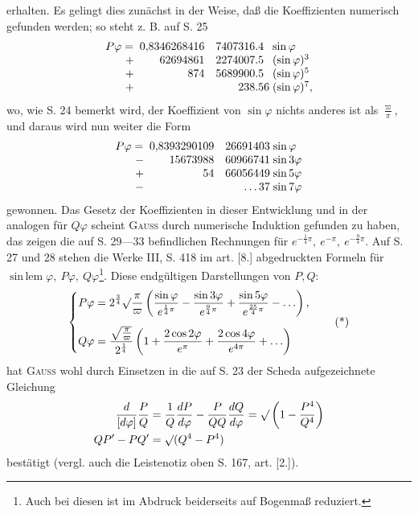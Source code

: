 \clearpage{}
\begingroup\small
\makeatletter\tagsleft@true\let\veqno\@@leqno\makeatother
\noindent erhalten. Es gelingt dies zunächst in der Weise, daß die Koeffizienten numerisch gefunden werden; so steht z. B. auf S. 25
\[
\begin{array}{r@{\;}r@{\quad}r@{}c@{}l@{\;}l}
P\varphi={}&0{,}8346268416&7407316&.&4&\sin\varphi\\
{}+{}&62694861&2274007&.&5&(\sin\varphi)^3\\
{}+{}&874&5689900&.&5&(\sin\varphi)^5\\
{}+{}&&238&.&56&(\sin\varphi)^7,
\end{array}
\]
\noindent wo, wie S. 24 bemerkt wird, der Koeffizient von \(\sin\varphi\) nichts anderes ist als \(\frac\varpi\pi\), und daraus wird nun weiter die Form
\[
\begin{array}{r@{\;}r@{\quad}r@{\;}l}
P\varphi={}&0{,}8393290109&26691403&\sin\varphi\\
{}-{}&15673988&60966741&\sin3\varphi\\
{}+{}&54&66056449&\sin5\varphi\\
{}-{}&&\ldots37&\sin7\varphi
\end{array}
\]
\noindent gewonnen. Das Gesetz der Koeffizienten in dieser Entwicklung und in der analogen für \(Q\varphi\) scheint \textsc{Gauss} durch numerische Induktion gefunden zu haben, das zeigen die auf S. 29—33 befindlichen Rechnungen für \(e^{-\frac14\pi},\ e^{-\pi},\ e^{-\frac94\pi}\). Auf S. 27 und 28 stehen die Werke III, S. 418 im art. [8.] abgedruckten Formeln für \(\operatorname{sin\,lem}\varphi,\ P\varphi,\ Q\varphi\)\footnote{Auch bei diesen ist im Abdruck beiderseits auf Bogenmaß reduziert.}. Diese endgültigen Darstellungen von \(P,Q\):
\begin{equation}
\left\{\begin{aligned}
P\varphi&=2^{\frac34}\surd\frac\pi\varpi\left(\frac{\sin\varphi}{e^{\frac14\pi}}-\frac{\sin3\varphi}{e^{\frac94\pi}}+\frac{\sin5\varphi}{e^{\frac{25}4\pi}}-\ldots\right),\\[1ex]
Q\varphi&=\frac{\sqrt{\frac\pi\varpi}}{2^{\frac14}}\left(1+\frac{2\cos2\varphi}{e^\pi}+\frac{2\cos4\varphi}{e^{4\pi}}+\ldots\right)
\end{aligned}\right.\tag*{(*)}
\end{equation}
\noindent hat \textsc{Gauss} wohl durch Einsetzen in die auf S. 23 der Scheda aufgezeichnete Gleichung
\[
\begin{aligned}
\frac d{[d\varphi]}\frac PQ&=\frac1Q\frac{dP}{d\varphi}-\frac P{QQ}\frac{dQ}{d\varphi}=\surd\left(1-\frac{P^4}{Q^4}\right)\\
QP'-PQ'&=\surd(Q^4-P^4)
\end{aligned}
\]
\noindent bestätigt (vergl. auch die Leistenotiz oben S. 167, art. [2.]).

